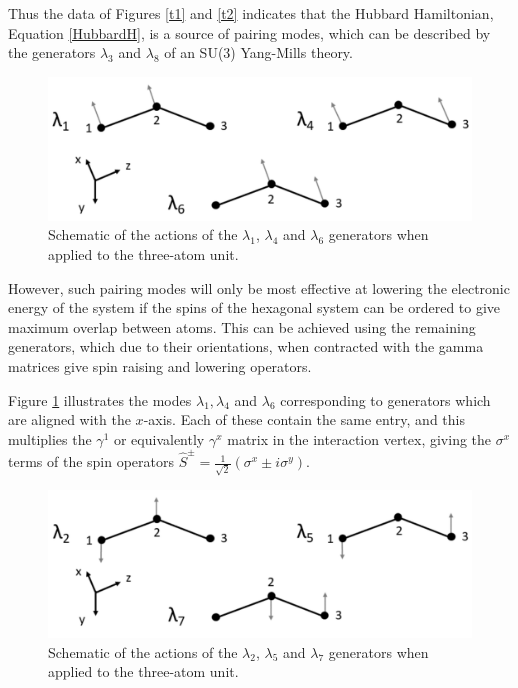 \documentclass[prb,showpacs,superscriptaddress,titlepage,amsmath,amssymb,twocolumn]{revtex4-1}
\begin{document}
Thus the data of Figures \ref{t1} and \ref{t2} indicates that the Hubbard Hamiltonian, Equation \ref{HubbardH}, is a source of pairing modes, which can be described by the generators $\lambda_{3}$ and $\lambda_{8}$ of an SU(3) Yang-Mills theory.
\begin{figure}
	\includegraphics[width=\columnwidth]{x-modes}
	\caption{Schematic of the actions of the $\lambda_{1}$, $\lambda_{4}$ and $\lambda_{6}$ generators when applied to the three-atom unit.}
	\label{x-modes}
\end{figure}

However, such pairing modes will only be most effective at lowering the electronic energy of the system if the spins of the hexagonal system can be ordered to give maximum overlap between atoms. This can be achieved using the remaining generators, which due to their orientations, when contracted with the gamma matrices give spin raising and lowering operators.

Figure \ref{x-modes} illustrates the modes $\lambda_{1}, \lambda_{4}$ and $\lambda_{6}$ corresponding to generators which are aligned with the $x$-axis. Each of these contain the same entry, and this multiplies the $\gamma^{1}$ or equivalently $\gamma^{x}$ matrix in the interaction vertex, giving the $\sigma^{x}$ terms of the spin operators $\hat{S}^{\pm} = \frac{1}{\sqrt{2}}(\sigma^{x}\pm i\sigma^{y})$.
\begin{figure}
	\includegraphics[width=\columnwidth]{y-modes}
	\caption{Schematic of the actions of the $\lambda_{2}$, $\lambda_{5}$ and $\lambda_{7}$ generators when applied to the three-atom unit.}
	\label{y-modes}
\end{figure}
\end{document}
